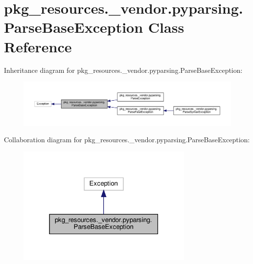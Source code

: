 \hypertarget{classpkg__resources_1_1__vendor_1_1pyparsing_1_1ParseBaseException}{}\section{pkg\+\_\+resources.\+\_\+vendor.\+pyparsing.\+Parse\+Base\+Exception Class Reference}
\label{classpkg__resources_1_1__vendor_1_1pyparsing_1_1ParseBaseException}


Inheritance diagram for pkg\+\_\+resources.\+\_\+vendor.\+pyparsing.\+Parse\+Base\+Exception\+:
\nopagebreak
\begin{figure}[H]
\begin{center}
\leavevmode
\includegraphics[width=350pt]{classpkg__resources_1_1__vendor_1_1pyparsing_1_1ParseBaseException__inherit__graph}
\end{center}
\end{figure}


Collaboration diagram for pkg\+\_\+resources.\+\_\+vendor.\+pyparsing.\+Parse\+Base\+Exception\+:
\nopagebreak
\begin{figure}[H]
\begin{center}
\leavevmode
\includegraphics[width=246pt]{classpkg__resources_1_1__vendor_1_1pyparsing_1_1ParseBaseException__coll__graph}
\end{center}
\end{figure}
